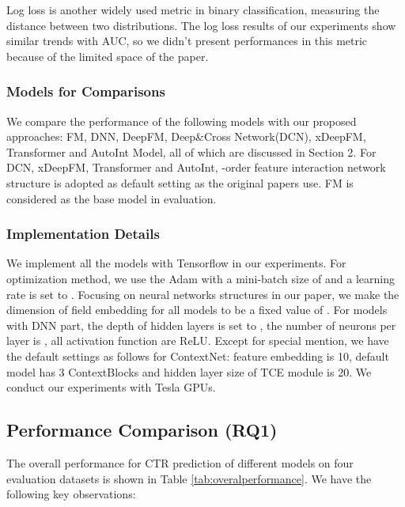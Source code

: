 \documentclass[sigconf]{acmart}
\begin{document}
Log loss is another widely used metric in binary classification, measuring the distance between two distributions. The log loss results of our experiments show similar trends with AUC, so we didn't  present performances in this metric because of the limited space of the paper.




\subsubsection{Models for Comparisons}
We compare the performance of the following models with our proposed approaches: FM, DNN, DeepFM, Deep\&Cross Network(DCN), xDeepFM, Transformer and AutoInt Model, all of which are discussed in Section 2. For DCN, xDeepFM, Transformer and AutoInt, -order feature interaction network structure is adopted as default setting as the original papers use. FM is considered as the base model in evaluation.


\subsubsection{Implementation Details}
We implement all the models with Tensorflow in our experiments. For optimization method, we use the Adam with a mini-batch size of  and a learning rate is set to .  Focusing on neural networks structures in our paper, we make the dimension of field embedding for all models to be a fixed value of . For models with DNN part, the depth of hidden layers is set to , the number of neurons per layer is , all activation function are ReLU. Except for special mention, we have the default settings as follows for ContextNet: feature embedding is 10, default model has 3 ContextBlocks and hidden layer size of TCE module is 20. We conduct our experiments with  Tesla  GPUs.





\subsection{Performance Comparison (RQ1)}
The overall performance for CTR prediction of different models on four evaluation datasets is shown in Table \ref{tab:overalperformance}. We have the following key observations:
\end{document}
